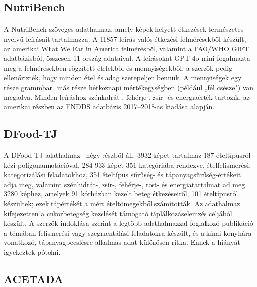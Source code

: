 \subsection{NutriBench}
\paragraph{}A NutriBench \cite{dhaliwal2025nutribench} szöveges adathalmaz, amely képek helyett étkezések természetes nyelvű leírásait tartalmazza. A 11857 leírás valós étkezési felmérésekből készült, az amerikai What We Eat in America felmérésből, valamint a FAO/WHO GIFT adatbázisból, összesen 11 ország adataival. A leírásokat GPT-4o-mini fogalmazta meg a felmérésekben rögzített ételekből és mennyiségekből, a szerzők pedig ellenőrizték, hogy minden étel és adag szerepeljen bennük. A mennyiségek egy része grammban, más része hétköznapi mértékegységben (például „fél csésze") van megadva. Minden leíráshoz szénhidrát-, fehérje-, zsír- és energiaérték tartozik, az amerikai részben az FNDDS adatbázis 2017--2018-as kiadása alapján.

\subsection{DFood-TJ}
\paragraph{}A DFood-TJ adathalmaz~\cite{jin2026dfoodtj} négy részből áll: 3932 képet tartalmaz 187 ételtípusról kézi poligonannotációval, 284 933 képet 351 kategóriába rendezve, ételfelismerési, kategorizálási feladatokhoz, 351 ételtípus sűrűség- és tápanyagsűrűség-értékeit adja meg, valamint szénhidrát-, zsír-, fehérje-, rost- és energiatartalmat ad meg 3280 képhez, amelyek 91 kórházban kezelt beteg étkezéseiről, 101 ételtípusról készültek; ezek tápértékét a mért ételtömegekből számították. Az adathalmaz kifejezetten a cukorbetegség kezelését támogató táplálkozáselemzés céljából készült. A szerzők indoklása szerint a legtöbb adathalmazzal foglalkozó publikáció a témában felismerési vagy szegmentálási feladatokra készült, és a kínai konyhára vonatkozó, tápanyagbecslésre alkalmas adat különösen ritka. Ennek a hiányát igyekeztek pótolni.

\subsection{ACETADA}
\label{subsec:ACETADA}
